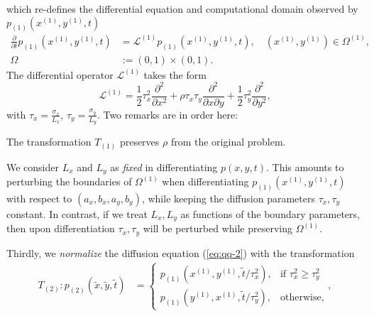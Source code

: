which re-defines the differential equation and computational domain observed by
$p_{(1)}(x^{(1)}, y^{(1)}, t)$
\begin{align}
  \frac{\partial}{\partial t}p_{(1)}(x^{(1)}, y^{(1)}, t) &= \mathcal{L}^{(1)}p_{(1)}(x^{(1)}, y^{(1)}, t),\quad (x^{(1)},y^{(1)}) \in \Omega^{(1)}, \label{eq:qq-2} \\
  \Omega &:= (0,1) \times (0,1). \nonumber 
\end{align}
The differential operator $\mathcal{L}^{(1)}$ takes the form
\[
  \mathcal{L}^{(1)} = \frac{1}{2} \tau_x^2 \frac{\partial^2}{\partial x^2}
  + \rho\tau_x\tau_y \frac{\partial^2}{\partial x \partial y} + \frac{1}{2}\tau_y^2 \frac{\partial^2}{\partial y^2},
\]
with $\tau_x = \frac{\sigma_x}{L_x}$,
$\tau_y = \frac{\sigma_y}{L_y}$.  Two remarks are in order here:
\begin{remark}
  The transformation $T_{(1)}$ preserves $\rho$ from the original problem.
\end{remark}
\begin{remark} \label{remark:const-L} We consider $L_x$ and $L_y$ as
  \textit{fixed} in differentiating $p(x,y,t)$. This amounts to
  perturbing the boundaries of $\Omega^{(1)}$ when differentiating
  $p_{(1)}(x^{(1)}, y^{(1)}, t)$ with respect to $(a_x, b_x, a_y, b_y)$,
  while keeping the diffusion parameters $\tau_x, \tau_y$
  constant. In contrast, if we treat $L_x, L_y$ as functions of the
  boundary parameters, then upon differentiation $\tau_x, \tau_y$ will
  be perturbed while preserving $\Omega^{(1)}$.
\end{remark}
Thirdly, we \textit{normalize} the diffusion equation (\ref{eq:qq-2}) with the transformation
\begin{align}
  T_{(2)}: p_{(2)}(\tilde{x}, \tilde{y}, \tilde{t}) &= \left\{ \begin{array}{cc}
                                                  p_{(1)}(x^{(1)}, y^{(1)}, \tilde{t}/\tau_x^2), &\mbox{if } \tau_x^2 \geq \tau_y^2 \\
                                                 p_{(1)}(y^{(1)}, x^{(1)}, \tilde{t}/\tau_y^2), &\mbox{otherwise},
                                                  \end{array} \right., \label{eq:T2}
\end{align}
